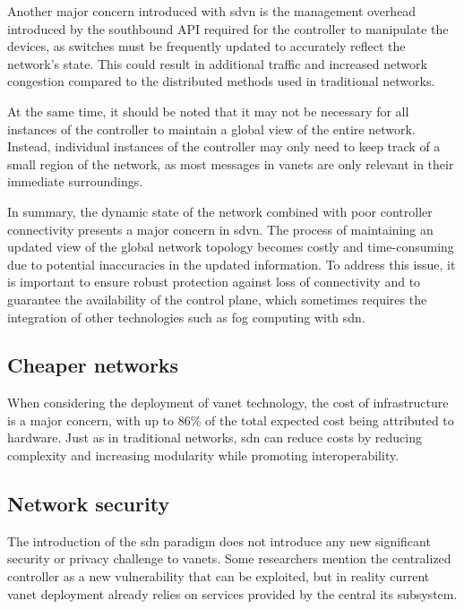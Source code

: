 Another major concern introduced with \gls{sdvn} is the management overhead introduced by the southbound API required for the controller to manipulate the devices, as switches must be frequently updated to accurately reflect the network's state. This could result in additional traffic and increased network congestion compared to the distributed methods used in traditional networks.

At the same time, it should be noted that it may not be necessary for all instances of the controller to maintain a global view of the entire network. Instead, individual instances of the controller may only need to keep track of a small region of the network, as most messages in \glspl{vanet} are only relevant in their immediate surroundings\cite{sarpong_potential_2023}.

In summary, the dynamic state of the network combined with poor controller connectivity presents a major concern in \gls{sdvn}. The process of maintaining an updated view of the global network topology becomes costly and time-consuming due to potential inaccuracies in the updated information\cite{ben_jaballah_security_2020}. To address this issue, it is important to ensure robust protection against loss of connectivity and to guarantee the availability of the control plane, which sometimes requires the integration of other technologies such as fog computing with \gls{sdn}\cite{ben_jaballah_security_2020}.

\subsection{Cheaper networks}

When considering the deployment of \gls{vanet} technology, the cost of infrastructure is a major concern, with up to 86\% of the total expected cost being attributed to hardware\cite{asselin-miller_study_2016}. Just as in traditional networks, \gls{sdn} can reduce costs by reducing complexity and increasing modularity while promoting interoperability.

\subsection{Network security}

The introduction of the \gls{sdn} paradigm does not introduce any new significant security or privacy challenge to \glspl{vanet}. Some researchers\cite{ben_jaballah_security_2020} mention the centralized controller as a new vulnerability that can be exploited, but in reality current \gls{vanet} deployment already relies on services provided by the central \gls{its} subsystem.

